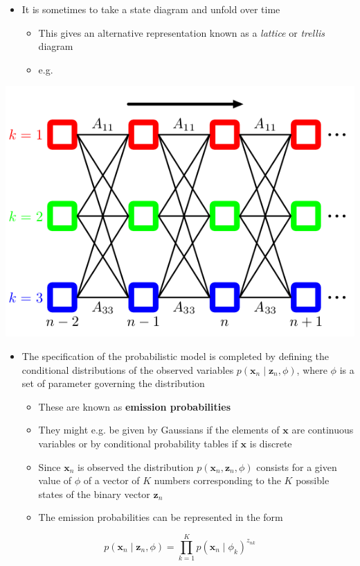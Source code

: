 \documentclass[11pt]{article}
\begin{document}
\begin{itemize}
\item It is sometimes to take a state diagram and unfold over time
\begin{itemize}
\item This gives an alternative representation known as a \emph{lattice} or \emph{trellis} diagram
\item e.g.
\end{itemize}
\end{itemize}
\begin{center}
\includegraphics[width=.9\linewidth]{Sequential Data/screenshot_2018-10-29_16-43-52.png}
\end{center}

\begin{itemize}
\item The specification of the probabilistic model is completed by defining the conditional distributions of the observed variables \(p(\pmb x_n \mid \pmb z_n, \phi)\), where \(\phi\) is a set of parameter governing the distribution
\begin{itemize}
\item These are known as \textbf{emission probabilities}
\item They might e.g. be given by Gaussians if the elements of \(\pmb x\) are continuous variables or by conditional probability tables if \(\pmb x\) is discrete
\item Since \(\pmb x_n\) is observed the distribution \(p(\pmb x_n, \pmb z_n, \phi)\) consists for a given value of \(\phi\) of a vector of \(K\) numbers corresponding to the \(K\) possible states of the binary vector \(\pmb z_n\)
\item The emission probabilities can be represented in the form
\end{itemize}
\end{itemize}
\begin{equation}
  p(\pmb x_n \mid \pmb z_n, \phi) = \prod_{k=1}^K p(\pmb x_n \mid \phi_k)^{z_{nk}}
\end{equation}
\end{document}
